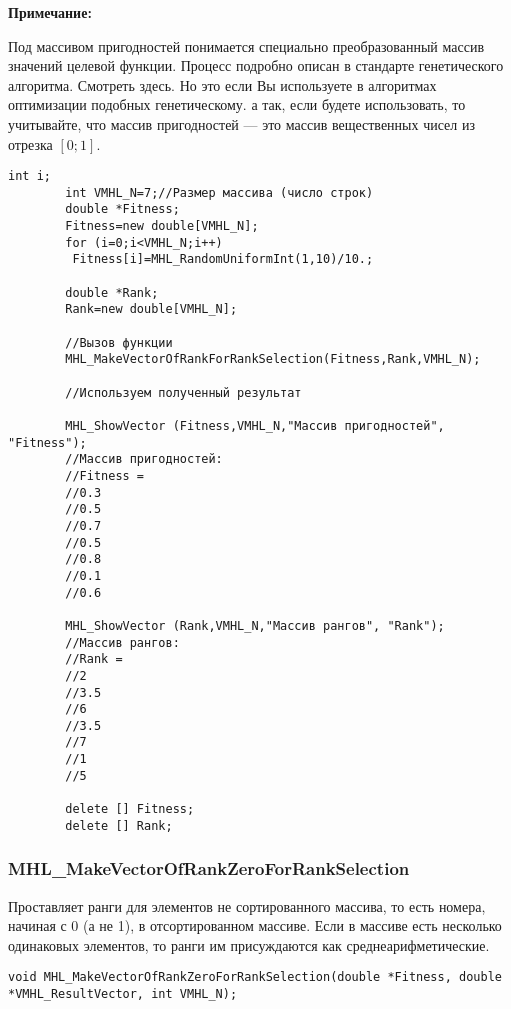 \documentclass[a4paper,12pt]{article}
\begin{document}
\textbf{Примечание:}

 Под массивом пригодностей понимается специально преобразованный массив значений целевой функции. Процесс подробно описан в стандарте генетического алгоритма. Смотреть здесь. Но это если Вы используете в алгоритмах оптимизации подобных генетическому. а так, если будете использовать, то учитывайте, что массив пригодностей --- это массив вещественных чисел из отрезка $[0;1]$.



\begin{lstlisting}[label=code_use_MHL_MakeVectorOfRankForRankSelection,caption=Пример использования]
        int i;
        int VMHL_N=7;//Размер массива (число строк)
        double *Fitness;
        Fitness=new double[VMHL_N];
        for (i=0;i<VMHL_N;i++)
         Fitness[i]=MHL_RandomUniformInt(1,10)/10.;

        double *Rank;
        Rank=new double[VMHL_N];

        //Вызов функции
        MHL_MakeVectorOfRankForRankSelection(Fitness,Rank,VMHL_N);

        //Используем полученный результат

        MHL_ShowVector (Fitness,VMHL_N,"Массив пригодностей", "Fitness");
        //Массив пригодностей:
        //Fitness =
        //0.3
        //0.5
        //0.7
        //0.5
        //0.8
        //0.1
        //0.6

        MHL_ShowVector (Rank,VMHL_N,"Массив рангов", "Rank");
        //Массив рангов:
        //Rank =
        //2
        //3.5
        //6
        //3.5
        //7
        //1
        //5

        delete [] Fitness;
        delete [] Rank;
\end{lstlisting}

\subsubsection{MHL\_MakeVectorOfRankZeroForRankSelection}\label{MHL_MakeVectorOfRankZeroForRankSelection}

Проставляет ранги для элементов не сортированного массива, то есть номера, начиная с 0 (а не 1), в отсортированном массиве.  Если в массиве есть несколько одинаковых элементов, то ранги им присуждаются как среднеарифметические.


\begin{lstlisting}[label=code_syntax_MHL_MakeVectorOfRankZeroForRankSelection,caption=Синтаксис]
void MHL_MakeVectorOfRankZeroForRankSelection(double *Fitness, double *VMHL_ResultVector, int VMHL_N);
\end{lstlisting}
\end{document}
